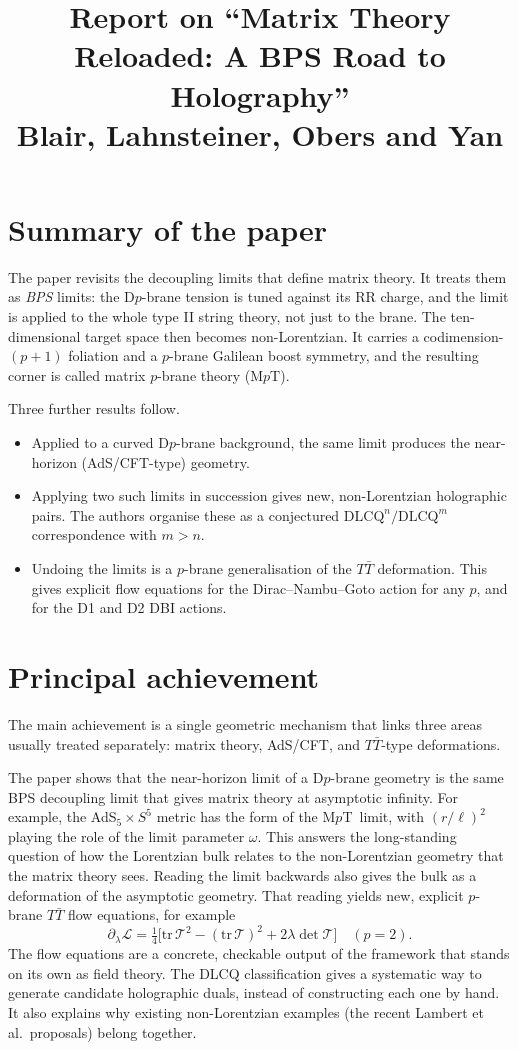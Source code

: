 \documentclass[11pt,a4paper]{article}
\title{Report on ``Matrix Theory Reloaded: A BPS Road to Holography''\\[2pt]
\large Blair, Lahnsteiner, Obers and Yan}
\date{}
\newcommand{\TTbar}{T\bar{T}}
\newcommand{\MpT}{M$p$T}
\begin{document}
\maketitle

\section*{Summary of the paper}

The paper revisits the decoupling limits that define matrix theory. It treats them as \emph{BPS} limits: the D$p$-brane tension is tuned against its RR charge, and the limit is applied to the whole type II string theory, not just to the brane. The ten-dimensional target space then becomes non-Lorentzian. It carries a codimension-$(p+1)$ foliation and a $p$-brane Galilean boost symmetry, and the resulting corner is called matrix $p$-brane theory (\MpT).

Three further results follow.
\begin{itemize}
\item Applied to a curved D$p$-brane background, the same limit produces the near-horizon (AdS/CFT-type) geometry.
\item Applying two such limits in succession gives new, non-Lorentzian holographic pairs. The authors organise these as a conjectured $\mathrm{DLCQ}^n/\mathrm{DLCQ}^m$ correspondence with $m>n$.
\item Undoing the limits is a $p$-brane generalisation of the $\TTbar$ deformation. This gives explicit flow equations for the Dirac--Nambu--Goto action for any $p$, and for the D1 and D2 DBI actions.
\end{itemize}

\section{Principal achievement}

The main achievement is a single geometric mechanism that links three areas usually treated separately: matrix theory, AdS/CFT, and $\TTbar$-type deformations.

The paper shows that the near-horizon limit of a D$p$-brane geometry is the same BPS decoupling limit that gives matrix theory at asymptotic infinity. For example, the AdS$_5\times S^5$ metric has the form of the \MpT\ limit, with $(r/\ell)^2$ playing the role of the limit parameter $\omega$. This answers the long-standing question of how the Lorentzian bulk relates to the non-Lorentzian geometry that the matrix theory sees. Reading the limit backwards also gives the bulk as a deformation of the asymptotic geometry. That reading yields new, explicit $p$-brane $\TTbar$ flow equations, for example
\[
\partial_\lambda \mathcal{L}=\tfrac14\big[\mathrm{tr}\,\mathcal{T}^2-(\mathrm{tr}\,\mathcal{T})^2+2\lambda\det\mathcal{T}\big]\quad (p=2).
\]
The flow equations are a concrete, checkable output of the framework that stands on its own as field theory. The DLCQ classification gives a systematic way to generate candidate holographic duals, instead of constructing each one by hand. It also explains why existing non-Lorentzian examples (the recent Lambert et al.\ proposals) belong together.
\end{document}
